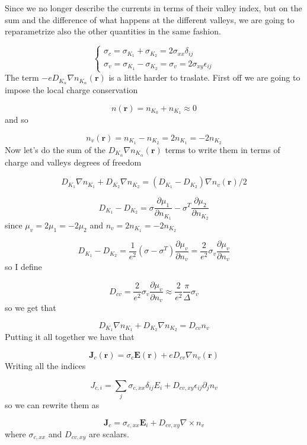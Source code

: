 Since we no longer describe the currents in terms of their valley index, but on the sum and the difference of what happens at the different valleys, we are going to reparametrize also the other quantities in the same fashion.


\begin{equation}
    \begin{cases}
        \sigma_c=\sigma_{K_1}+\sigma_{K_2}=2\sigma_{xx}\delta_{ij}\\
        \sigma_v=\sigma_{K_1}-\sigma_{K_2}=\sigma_v=2\sigma_{xy}\epsilon_{ij}
    \end{cases}
\end{equation}
The term $-eD_{K_\alpha}\nabla n_{K_\alpha}(\mathbf r)$ is a little harder to traslate. First off we are going to impose the local charge conservation

\[
    n(\mathbf r)=n_{K_0}+n_{K_1}\approx 0
\]
and so 

\begin{equation}
    n_v(\mathbf r)=n_{K_1}-n_{K_2}=2n_{K_1}=-2n_{K_2}
\end{equation}
Now let's do the sum of the $D_{K_\alpha}\nabla n_{K_\alpha}(\mathbf r)$ terms to write them in terms of charge and valleys degrees of freedom

\[D_{K_1}\nabla n_{K_1}+D_{K_2}\nabla n_{K_2}=(D_{K_1}-D_{K_2})\nabla n_v(\mathbf r)/2\]

\[D_{K_1}-D_{K_2}=\sigma \frac{\partial \mu_1}{\partial n_{K_1}}- \sigma^T \frac{\partial \mu_2}{\partial n_{K_2}}\]
since $\mu_v=2\mu_1=-2\mu_2$ and $n_v=2n_{K_1}=-2n_{K_2}$

\[D_{K_1}-D_{K_2}=\frac 1{e^2}(\sigma-\sigma^T)\frac{\partial \mu_v}{\partial n_v}=\frac 2{e^2}\sigma_v\frac{\partial \mu_v}{\partial n_v}\]
so I define 

\[D_{cv}=\frac 2{e^2}\sigma_v\frac{\partial \mu_v}{\partial n_v}\approx\frac 2{e^2} \frac \pi\Delta\sigma_v\]
so we get that

\[D_{K_1}\nabla n_{K_1}+D_{K_2}\nabla n_{K_2}=D_{cv}n_v\]
Putting it all together we have that

\[\mathbf J_c(\mathbf r)=\sigma_c \mathbf E(\mathbf r)+eD_{cv}\nabla n_v(\mathbf r)\]
Writing all the indices

\begin{equation}
    J_{c,i}=\sum_j \sigma_{c,xx}\delta_{ij}E_i+D_{cv,xy}\epsilon_{ij}\partial_j n_v
\end{equation}
so we can rewrite them as


\begin{equation}
    \mathbf J_{c}= \sigma_{c,xx}\mathbf E_i + D_{cv,xy} \nabla \times n_v
    \label{eq:diff-jc}
\end{equation}
where $\sigma_{c,xx}$ and $D_{cv,xy}$ are scalars.

